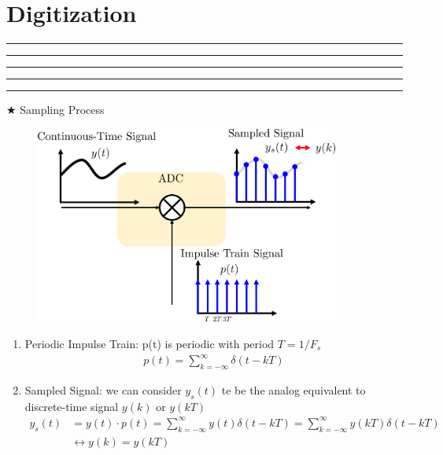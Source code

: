\setcounter{chapter}{7}
\setcounter{section}{0}
\section{Digitization}
\vspace{-8pt} \hrule \hrule \hrule \hrule \hrule  \vspace{12pt}

$\bigstar$ Sampling Process
	    \begin{figure}[!h]
	        \centering
	        \includegraphics[width=10cm]{./FIG_Franklin/fig8-smc3.png}
	    \end{figure}
    \begin{enumerate}
    	\item Periodic Impulse Train: p(t) is periodic with period $T = 1/F_s$
    	\begin{align*}
    		p(t) = \sum_{k=-\infty}^{\infty} \delta(t-kT)
    	\end{align*}
     	\item Sampled Signal: we can consider $y_s(t)$ te be the analog equivalent to discrete-time signal $y(k)$ or $y(kT)$
    	\begin{align*}
    		y_s(t) &= y(t) \cdot p(t) = \sum_{k=-\infty}^{\infty} y(t)\delta(t-kT) = \sum_{k=-\infty}^{\infty} y(kT)\delta(t-kT)\\
    			&\leftrightarrow y(k) = y(kT)
    	\end{align*}
	\end{enumerate}